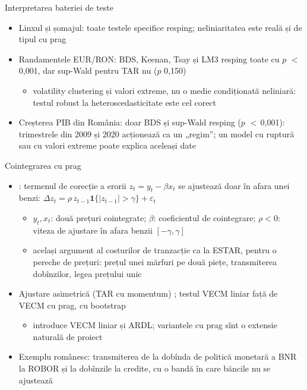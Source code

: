 \begin{frame}{Interpretarea bateriei de teste}
\itemsize{\small}
\begin{itemize}
    \item Linxul și șomajul: toate testele specifice resping; neliniaritatea este reală și de tipul cu prag
    \item Randamentele EUR/RON: BDS, Keenan, Tsay și LM3 resping toate cu $p$ $<$\,0{,}001, dar sup-Wald pentru TAR nu ($p$ 0{,}150)
    \begin{itemize}
        \item volatility clustering și valori extreme, nu o medie condiționată neliniară: testul robust la heteroscedasticitate este cel corect
    \end{itemize}
    \item Creșterea PIB din România: doar BDS și sup-Wald resping ($p$ $<$\,0{,}001): trimestrele din 2009 și 2020 acționează ca un „regim”; un model cu ruptură sau cu valori extreme poate explica aceleași date
\end{itemize}
\end{frame}

\begin{frame}{Cointegrarea cu prag}
\itemsize{\small}
\begin{itemize}
    \item {}: termenul de corecție a erorii $z_t = y_t - \beta x_t$ se ajustează doar în afara unei benzi: $\Delta z_t = \rho\,z_{t-1}\mathbf 1\{|z_{t-1}| > \gamma\} + \varepsilon_t$
    \begin{itemize}
        \item $y_t, x_t$: două prețuri cointegrate; $\beta$: coeficientul de cointegrare; $\rho < 0$: viteza de ajustare în afara benzii $[-\gamma, \gamma]$
        \item același argument al costurilor de tranzacție ca la ESTAR, pentru o pereche de prețuri: prețul unei mărfuri pe două piețe, transmiterea dobînzilor, legea prețului unic
    \end{itemize}
    \item Ajustare asimetrică (TAR cu momentum) ; testul VECM liniar față de VECM cu prag, cu bootstrap 
    \begin{itemize}
        \item {} introduce VECM liniar și ARDL; variantele cu prag sînt o extensie naturală de proiect
    \end{itemize}
    \item Exemplu românesc: transmiterea de la dobînda de politică monetară a BNR la ROBOR și la dobînzile la credite, cu o bandă în care băncile nu se ajustează
\end{itemize}
\end{frame}


